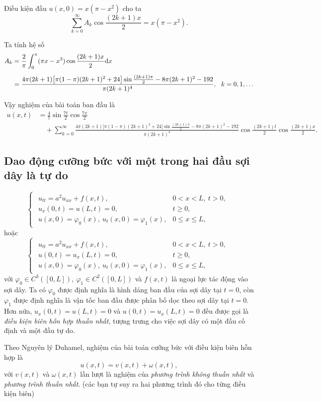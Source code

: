 \documentclass[10pt, a4paper]{article}
\begin{document}
	Điều kiện đầu $u(x,0)=x(\pi-x^2)$ cho ta $$\sum_{k=0}^\infty A_k\cos\frac{(2k+1)x}{2}=x(\pi-x^2).$$
	
	Ta tính hệ số \begin{align*}
		A_k&=\frac2\pi\int_0^\pi(\pi x-x^3)\cos\frac{(2k+1)x}{2}\mathrm dx\\
		\noalign{\vskip5pt}
		&=\frac{4\pi(2k+1)\big[\pi(1-\pi)(2k+1)^2+24\big]\sin\frac{(2k+1)\pi}{2}-8\pi(2k+1)^2-192}{\pi(2k+1)^4},~~k=0,1,\ldots
	\end{align*}
	
	Vậy nghiệm của bài toán ban đầu là \begin{align*}
		u(x,t)&=\frac47\sin\frac{7t}{2}\cos\frac{7x}{2}\\
		&\,\,\,\,\,\,+\sum_{k=0}^\infty\frac{4\pi(2k+1)\big[\pi(1-\pi)(2k+1)^2+24\big]\sin\frac{(2k+1)\pi}{2}-8\pi(2k+1)^2-192}{\pi(2k+1)^4}\cos\frac{(2k+1)t}{2}\cos\frac{(2k+1)x}{2}.
	\end{align*}
	\subsection{Dao động cưỡng bức với một trong hai đầu sợi dây là tự do}
	\vspace{2mm}
	\begin{tcolorbox}[enhanced,colback=blue!5!white,colframe=blue!75!black,sharp corners=all,shadow={0mm}{0mm}{-1.5mm}%
		{fill=blue!75!red,opacity=0.3},title=\textbf{Dạng của bài toán}]
		$$\begin{cases}
			\begin{array}{ll}
				u_{tt}=a^2u_{xx}+f(x,t), & 0<x<L,~t>0,\\
				u_x(0,t)=u(L,t)=0, & t\ge0,\\
				u(x,0)=\varphi_0(x),~u_t(x,0)=\varphi_1(x), & 0\le x\le L,
			\end{array}
		\end{cases}$$
		hoặc $$\begin{cases}
			\begin{array}{ll}
				u_{tt}=a^2u_{xx}+f(x,t), & 0<x<L,~t>0,\\
				u(0,t)=u_x(L,t)=0, & t\ge0,\\
				u(x,0)=\varphi_0(x),~u_t(x,0)=\varphi_1(x), & 0\le x\le L,
			\end{array}
		\end{cases}$$
		với $\varphi_0\in C^3([0,L]),~\varphi_1\in C^2([0,L])$ và $f(x,t)$ là ngoại lực tác động vào sợi dây.\vskip7pt
		\quad Ta có $\varphi_0$ được định nghĩa là hình dáng ban đầu của sợi dây tại $t=0$, còn $\varphi_1$ được định nghĩa là vận tốc ban đầu được phân bố dọc theo sợi dây tại $t=0$.\vskip7pt
		\quad Hơn nữa, $u_x(0,t)=u(L,t)=0$ và $u(0,t)=u_x(L,t)=0$ đều được gọi là \textit{điều kiện biên hỗn hợp thuần nhất}, tượng trưng cho việc sợi dây có một đầu cố định và một đầu tự do.
	\end{tcolorbox}
	\vspace{2mm}
	Theo Nguyên lý Duhamel, nghiệm của bài toán cưỡng bức với điều kiện biên hỗn hợp là $$u(x,t)=v(x,t)+\omega(x,t),$$
	với $v(x,t)$ và $\omega(x,t)$ lần lượt là nghiệm của \textit{phương trình không thuần nhất} và \textit{phương trình thuần nhất}. (các bạn tự suy ra hai phương trình đó cho từng điều kiện biên)\vskip7pt
	
\end{document}

